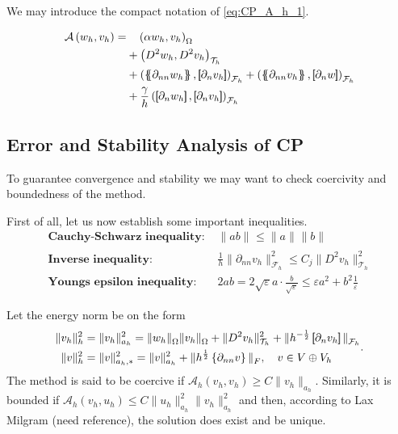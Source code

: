 We may introduce the compact notation of \eqref{eq:CP_A_h_1}.

\begin{equation}
\label{eq:CP_A_h}
\begin{split}
\mathcal{A} \left( w_{h}, v_{h} \right)   =&
  \quad  \left( \alpha  w_{h}, v_{h} \right) _{\Omega }\\
&  +  \left( D^2 w_{h}, D^2v_{h} \right) _{\mathcal{T} _{h}} \\
 & +
  \left( \mean{  \partial _{n n} w_{h} }, \jump{ \partial _{n }v_{h}} \right)_{\mathcal{F}_{h}}  +
 \left( \mean{ \partial _{n n} v_{h} }, \jump{ \partial _{n}w }      \right)_{\mathcal{F}_{h}}
 \\
 & + \frac{\gamma }{h}  \left( \jump{ \partial _{n} w_{h}}, \jump{ \partial _{n} v_{h}   }   \right)_{\mathcal{F}_{h}} \\
\end{split}
\end{equation}


\subsection{Error and Stability Analysis of CP}%
\label{sub:error_and_stability_analysis_of_c0ip}

To guarantee convergence and stability we may want to check coercivity and boundedness of the method.

First of all, let us now establish some important inequalities.
\[
\begin{split}
    \textbf{Cauchy-Schwarz inequality: } & \| ab \|_{  }^{  }  \le \| a \|_{  }^{  } \| b \|_{  }^{  }   \\
    \textbf{Inverse inequality: } & \frac{1}{h}\| \partial _{nn}  v_{h} \|_{\mathcal{F}_{h}   }^{2  }  \le C_{j} \| D ^2 v_{h} \|_{ \mathcal{T} _{h} }^{ 2 }   \\
    \textbf{Youngs epsilon inequality: } & 2ab =   2\sqrt{\varepsilon }a\cdot    \frac{b}{\sqrt{\varepsilon } } \le \varepsilon a^2+ b^2 \frac{1}{\varepsilon }
\end{split}
\]

Let the energy norm be on the form
\begin{equation}
\label{eq:A_energy_norm}
    \begin{split}
\| v_{h} \|_{ h }^{2  } & = \| v_{h} \|_{ a_{h} }^{ 2 } =  \|  w_{h} \|_{ \Omega  }^{  }\| v_{h} \|_{ \Omega  }^{  }  +  \| D ^2 v_{h} \|_{ \mathcal{T} _{h}  }^{ 2 }  + \|  h^{-\frac{1}{2}} \left[\!\!\left[  \partial _{n} v_{h}     \right]\!\!\right]\|_{  \mathcal{F} _{h} }^{  } \\
\| v \|_{ h }^{ 2 }  &= \| v \|_{ a_{h},* }^{ 2 } = \| v \|_{ a_{h} }^{ 2 }  + \| h^{\frac{1}{2}} \left\{ \partial _{nn } v\right\}  \|_{ F  }^{  }, \quad  v\in V \oplus V_{h}
    \end{split}
.\end{equation}
The method is said to be coercive if $\mathcal{A} _{h}\left( v_{h}, v_{h} \right) \ge  C \| v_{h} \|_{ a_{h} }^{  } $. Similarly, it is bounded if $ \mathcal{A} _{h} \left( v_{h}, u_{h} \right) \le  C \| u_{h} \|_{  a_{h}}^{ 2 }  \| v_{h} \|_{ a_{h}
}^{ 2 } $ and then, according to Lax Milgram (need reference), the solution does exist and be unique.

